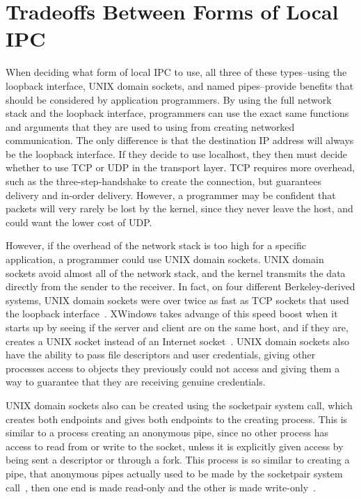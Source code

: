 \section{Tradeoffs Between Forms of Local IPC}
\label{sec:localIPCTradeoffs}
When deciding what form of local IPC to use, all three of these types--using the loopback interface, UNIX domain sockets, and named pipes--provide benefits that should be considered by application programmers.  By using the full network stack and the loopback interface, programmers can use the exact same functions and arguments that they are used to using from creating networked communication.  The only difference is that the destination IP address will always be the loopback interface.  If they decide to use localhost, they then must decide whether to use TCP or UDP in the transport layer.  TCP requires more overhead, such as the three-step-handshake to create the connection, but guarantees delivery and in-order delivery.  However, a programmer may be confident that packets will very rarely be lost by the kernel, since they never leave the host, and could want the lower cost of UDP.

However, if the overhead of the network stack is too high for a specific application, a programmer could use UNIX domain sockets.  UNIX domain sockets avoid almost all of the network stack, and the kernel transmits the data directly from the sender to the receiver.  In fact, on four different Berkeley-derived systems, UNIX domain sockets were over twice as fast as TCP sockets that used the loopback interface~\cite[p 223--224]{Stevens:1997:UNP:522800}.  XWindows takes advange of this speed boost when it starts up by seeing if the server and client are on the same host, and if they are, creates a UNIX socket instead of an Internet socket~\cite[p 373]{Stevens:1997:UNP:522800}.  UNIX domain sockets also have the ability to pass file descriptors and user credentials, giving other processes access to objects they previously could not access and giving them a way to guarantee that they are receiving genuine credentials.

UNIX domain sockets also can be created using the socketpair system call, which creates both endpoints and gives both endpoints to the creating process.  This is similar to a process creating an anonymous pipe, since no other process has access to read from or write to the socket, unless it is explicitly given access by being sent a descriptor or through a fork.  This process is so similar to creating a pipe, that anonymous pipes actually used to be made by the socketpair system call~\cite{apple_2005}, then one end is made read-only and the other is made write-only~\cite[p 253]{Stevens:1996:TIT:233130}.

